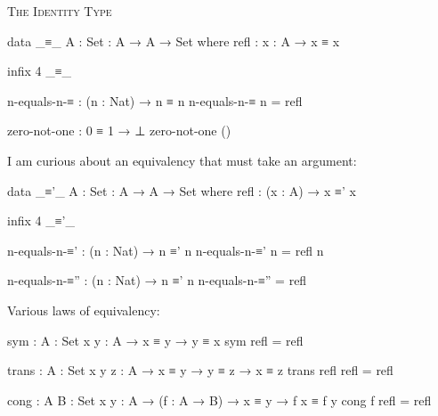 \documentclass{article}
\begin{document}
\noindent
\textsc{The Identity Type}

\begin{code}
data _≡_ {A : Set} : A → A → Set where
    refl : {x : A} → x ≡ x

infix 4 _≡_

n-equals-n-≡ : (n : Nat) → n ≡ n
n-equals-n-≡ n = refl

zero-not-one : 0 ≡ 1 → ⊥
zero-not-one ()
\end{code}

\noindent
I am curious about an equivalency that must take an argument:

\begin{code}
data _≡'_ {A : Set} : A → A → Set where
    refl : (x : A) → x ≡' x

infix 4 _≡'_

n-equals-n-≡' : (n : Nat) → n ≡' n
n-equals-n-≡' n = refl n

n-equals-n-≡'' : (n : Nat) → n ≡' n
n-equals-n-≡'' = refl
\end{code}

\noindent
Various laws of equivalency:

\begin{code}
sym : {A : Set} {x y : A} → x ≡ y → y ≡ x
sym refl = refl

trans : {A : Set} {x y z : A} → x ≡ y → y ≡ z → x ≡ z
trans refl refl = refl

cong : {A B : Set} {x y : A} → (f : A → B) → x ≡ y → f x ≡ f y
cong f refl = refl
\end{code}
\end{document}
